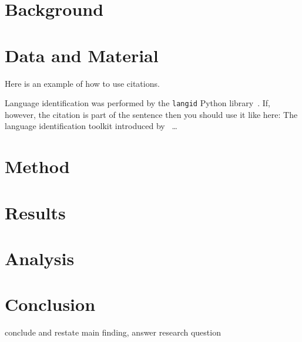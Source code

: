 \documentclass[
10pt, %
a4paper, %
oneside, %
headinclude,footinclude, %
] {book}%
\begin{document}
\clearpage

\chapter{Background}

\chapter{Data and Material}
\label{datagathering}

Here is an example of how to use citations.

Language identification was performed by the \texttt{langid} Python library~\citep{langid}. If, however, the citation is part of the sentence then you should use it like here: The language identification toolkit introduced by~\cite{langid}
\ldots

\chapter{Method}


\chapter{Results}


\chapter{Analysis}


\chapter{Conclusion}
\label{conclusion}

conclude and restate main finding, answer research question
\end{document}
